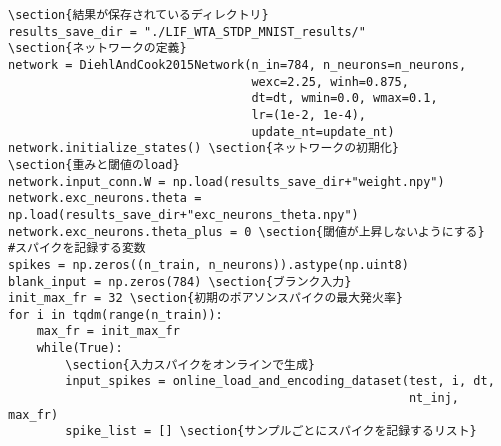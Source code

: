 \begin{verbatim}
\section{結果が保存されているディレクトリ}
results_save_dir = "./LIF_WTA_STDP_MNIST_results/"
\section{ネットワークの定義}
network = DiehlAndCook2015Network(n_in=784, n_neurons=n_neurons,
                                  wexc=2.25, winh=0.875,
                                  dt=dt, wmin=0.0, wmax=0.1,
                                  lr=(1e-2, 1e-4),
                                  update_nt=update_nt)
network.initialize_states() \section{ネットワークの初期化}
\section{重みと閾値のload}
network.input_conn.W = np.load(results_save_dir+"weight.npy")
network.exc_neurons.theta = np.load(results_save_dir+"exc_neurons_theta.npy")
network.exc_neurons.theta_plus = 0 \section{閾値が上昇しないようにする}
#スパイクを記録する変数
spikes = np.zeros((n_train, n_neurons)).astype(np.uint8)
blank_input = np.zeros(784) \section{ブランク入力}
init_max_fr = 32 \section{初期のポアソンスパイクの最大発火率}
for i in tqdm(range(n_train)):
    max_fr = init_max_fr
    while(True):
        \section{入力スパイクをオンラインで生成}
        input_spikes = online_load_and_encoding_dataset(test, i, dt,
                                                        nt_inj, max_fr)
        spike_list = [] \section{サンプルごとにスパイクを記録するリスト}

\end{verbatim}
